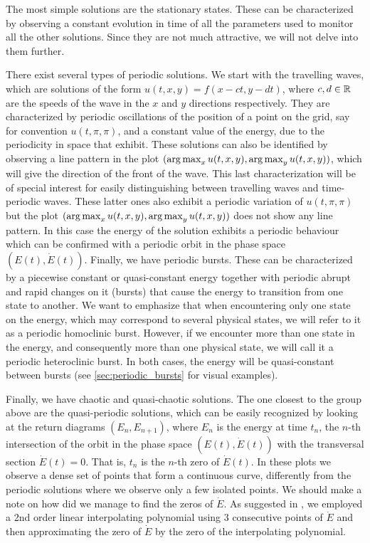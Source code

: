 \documentclass[twoside]{article}
\begin{document}
The most simple solutions are the stationary states. These can be characterized by observing a constant evolution in time of all the parameters used to monitor all the other solutions. Since they are not much attractive, we will not delve into them further.

There exist several types of periodic solutions. We start with the travelling waves, which are solutions of the form $u(t,x,y) = f(x-ct,y-dt)$, where $c,d\in\mathbb{R}$ are the speeds of the wave in the $x$ and $y$ directions respectively. They are characterized by periodic oscillations of the position of a point on the grid, say for convention $u(t,\pi,\pi)$, and a constant value of the energy, due to the periodicity in space that exhibit. These solutions can also be identified by observing a line pattern in the plot $(\operatorname*{arg\,max}_x u(t,x,y),\operatorname*{arg\,max}_y u(t,x,y))$, which will give the direction of the front of the wave. This last characterization will be of special interest for easily distinguishing between travelling waves and time-periodic waves. These latter ones also exhibit a periodic variation of $u(t,\pi,\pi)$ but the plot $(\operatorname*{arg\,max}_x u(t,x,y),\operatorname*{arg\,max}_y u(t,x,y))$ does not show any line pattern. In this case the energy of the solution exhibits a periodic behaviour which can be confirmed with a periodic orbit in the phase space $(E(t), \dot{E}(t))$. Finally, we have periodic bursts. These can be characterized by a piecewise constant or quasi-constant energy together with periodic abrupt and rapid changes on it (bursts) that cause the energy to transition from one state to another. We want to emphasize that when encountering only one state on the energy, which may correspond to several physical states, we will refer to it as a periodic homoclinic burst. However, if we encounter more than one state in the energy, and consequently more than one physical state, we will call it a periodic heteroclinic burst. In both cases, the energy will be quasi-constant between bursts (see \cref{sec:periodic_bursts} for visual examples).

Finally, we have chaotic and quasi-chaotic solutions. The one closest to the group above are the quasi-periodic solutions, which can be easily recognized by looking at the return diagrams $(E_n,E_{n+1})$, where $E_n$ is the energy at time $t_n$, the $n$-th intersection of the orbit in the phase space $(E(t), \dot{E}(t))$ with the transversal section $\dot{E}(t)=0$. That is, $t_n$ is the $n$-th zero of $\dot{E}(t)$. In these plots we observe a dense set of points that form a continuous curve, differently from the periodic solutions where we observe only a few isolated points. We should make a note on how did we manage to find the zeros of $\dot{E}$. As suggested in \cite{Kalogirou2015}, we employed a 2nd order linear interpolating polynomial using 3 consecutive points of $\dot{E}$ and then approximating the zero of $\dot{E}$ by the zero of the interpolating polynomial.
\end{document}
